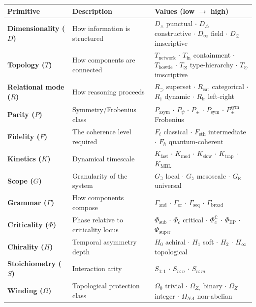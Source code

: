\documentclass[10pt,a4paper]{article}
\begin{document}
\begin{table}[htbp]
\centering
\small
{}
\begin{tabularx}{\textwidth}{>{\centering\arraybackslash}X >{\centering\arraybackslash}X >{\centering\arraybackslash}X}
\toprule
\rowcolor{gray!25}\textbf{Primitive} & \textbf{Description} & \textbf{Values (low $\to$ high)} \\
\midrule
\rowcolors{1}{white}{gray!10}
\textbf{Dimensionality ($D$)} & How information is structured & $D_{\wedge}$ punctual $\cdot$ $D_{\triangle}$ constructive $\cdot$ $D_{\infty}$ field $\cdot$ $D_\odot$ imscriptive \\
\textbf{Topology ($T$)} & How components are connected & $T_\text{network}$ $\cdot$ $T_\text{in}$ containment $\cdot$ $T_\text{bowtie}$ $\cdot$ $T_{\boxtimes}$ type-hierarchy $\cdot$ $T_\odot$ imscriptive \\
\textbf{Relational mode ($R$)} & How reasoning proceeds & $R_{\supset}$ superset $\cdot$ $R_\text{cat}$ categorical $\cdot$ $R_{\dagger}$ dynamic $\cdot$ $R_\text{lr}$ left-right \\
\textbf{Parity ($P$)} & Symmetry/Frobenius class & $P_\text{asym}$ $\cdot$ $P_\psi$ $\cdot$ $P_{\pm}$ $\cdot$ $P_\text{sym}$ $\cdot$ $P_{\pm}^{\text{sym}}$ Frobenius \\
\textbf{Fidelity ($F$)} & The coherence level required & $F_{\ell}$ classical $\cdot$ $F_\text{eth}$ intermediate $\cdot$ $F_{\hbar}$ quantum-coherent \\
\textbf{Kinetics ($K$)} & Dynamical timescale & $K_\text{fast}$ $\cdot$ $K_\text{mod}$ $\cdot$ $K_\text{slow}$ $\cdot$ $K_\text{trap}$ $\cdot$ $K_\text{MBL}$ \\
\textbf{Scope ($G$)} & Granularity of the system & $G_{\beth}$ local $\cdot$ $G_{\gimel}$ mesoscale $\cdot$ $G_{\aleph}$ universal \\
\textbf{Grammar ($\Gamma$)} & How components compose & $\Gamma_\text{and}$ $\cdot$ $\Gamma_\text{or}$ $\cdot$ $\Gamma_\text{seq}$ $\cdot$ $\Gamma_\text{broad}$ \\
\textbf{Criticality ($\Phi$)} & Phase relative to criticality locus & $\Phi_\text{sub}$ $\cdot$ $\Phi_c$ critical $\cdot$ $\Phi_c^{\mathbb{C}}$ $\cdot$ $\Phi_\text{EP}$ $\cdot$ $\Phi_\text{super}$ \\
\textbf{Chirality ($H$)} & Temporal asymmetry depth & $H_0$ achiral $\cdot$ $H_1$ soft $\cdot$ $H_2$ $\cdot$ $H_{\infty}$ topological \\
\textbf{Stoichiometry ($S$)} & Interaction arity & $S_{1:1}$ $\cdot$ $S_{n:n}$ $\cdot$ $S_{n:m}$ \\
\textbf{Winding ($\Omega$)} & Topological protection class & $\Omega_0$ trivial $\cdot$ $\Omega_{Z_2}$ binary $\cdot$ $\Omega_Z$ integer $\cdot$ $\Omega_{NA}$ non-abelian \\
\bottomrule
\end{tabularx}
\end{table}
\end{document}
